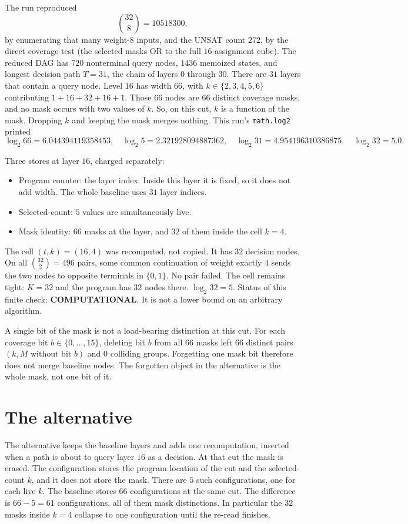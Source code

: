 \documentclass[11pt]{article}
\begin{document}
The run reproduced
\[
\binom{32}{8}=10518300,
\]
by enumerating that many weight-\(8\) inputs, and the UNSAT count \(272\), by the direct coverage test (the selected masks OR to the full \(16\)-assignment cube).
The reduced DAG has \(720\) nonterminal query nodes, \(1436\) memoized states, and longest decision path \(T=31\), the chain of layers \(0\) through \(30\).
There are \(31\) layers that contain a query node.
Level \(16\) has width \(66\), with \(k\in\{2,3,4,5,6\}\) contributing \(1+16+32+16+1\).
Those \(66\) nodes are \(66\) distinct coverage masks, and no mask occurs with two values of \(k\).
So, on this cut, \(k\) is a function of the mask.
Dropping \(k\) and keeping the mask merges nothing.
This run's \texttt{math.log2} printed
\[
\log_2 66=6.044394119358453,\quad
\log_2 5=2.321928094887362,\quad
\log_2 31=4.954196310386875,\quad
\log_2 32=5.0.
\]

Three stores at layer \(16\), charged separately:
\begin{itemize}
\item Program counter: the layer index. Inside this layer it is fixed, so it does not add width. The whole baseline uses \(31\) layer indices.
\item Selected-count: \(5\) values are simultaneously live.
\item Mask identity: \(66\) masks at the layer, and \(32\) of them inside the cell \(k=4\).
\end{itemize}
The cell \((t,k)=(16,4)\) was recomputed, not copied.
It has \(32\) decision nodes.
On all \(\binom{32}{2}=496\) pairs, some common continuation of weight exactly \(4\) sends the two nodes to opposite terminals in \(\{0,1\}\).
No pair failed.
The cell remains tight: \(K=32\) and the program has \(32\) nodes there.
\(\log_2 32=5\).
Status of this finite check: \textbf{COMPUTATIONAL}.
It is not a lower bound on an arbitrary algorithm.

A single bit of the mask is not a load-bearing distinction at this cut.
For each coverage bit \(b\in\{0,\ldots,15\}\), deleting bit \(b\) from all \(66\) masks left \(66\) distinct pairs \((k, M\text{ without bit }b)\) and \(0\) colliding groups.
Forgetting one mask bit therefore does not merge baseline nodes.
The forgotten object in the alternative is the whole mask, not one bit of it.

\section{The alternative}
The alternative keeps the baseline layers and adds one recomputation, inserted when a path is about to query layer \(16\) as a decision.
At that cut the mask is erased.
The configuration stores the program location of the cut and the selected-count \(k\), and it does not store the mask.
There are \(5\) such configurations, one for each live \(k\).
The baseline stores \(66\) configurations at the same cut.
The difference is \(66-5=61\) configurations, all of them mask distinctions.
In particular the \(32\) masks inside \(k=4\) collapse to one configuration until the re-read finishes.
\end{document}
